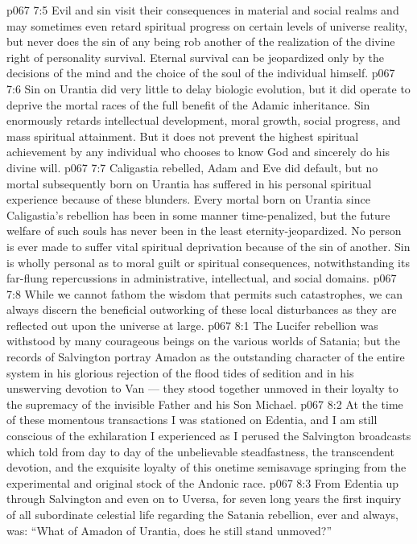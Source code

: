 \vs p067 7:5 Evil and sin visit their consequences in material and social realms and may sometimes even retard spiritual progress on certain levels of universe reality, but never does the sin of any being rob another of the realization of the divine right of personality survival. Eternal survival can be jeopardized only by the decisions of the mind and the choice of the soul of the individual himself.
\vs p067 7:6 Sin on Urantia did very little to delay biologic evolution, but it did operate to deprive the mortal races of the full benefit of the Adamic inheritance. Sin enormously retards intellectual development, moral growth, social progress, and mass spiritual attainment. But it does not prevent the highest spiritual achievement by any individual who chooses to know God and sincerely do his divine will.
\vs p067 7:7 Caligastia rebelled, Adam and Eve did default, but no mortal subsequently born on Urantia has suffered in his personal spiritual experience because of these blunders. Every mortal born on Urantia since Caligastia’s rebellion has been in some manner time\hyp{}penalized, but the future welfare of such souls has never been in the least eternity\hyp{}jeopardized. No person is ever made to suffer vital spiritual deprivation because of the sin of another. Sin is wholly personal as to moral guilt or spiritual consequences, notwithstanding its far\hyp{}flung repercussions in administrative, intellectual, and social domains.
\vs p067 7:8 \pc While we cannot fathom the wisdom that permits such catastrophes, we can always discern the beneficial outworking of these local disturbances as they are reflected out upon the universe at large.
\vs p067 8:1 The Lucifer rebellion was withstood by many courageous beings on the various worlds of Satania; but the records of Salvington portray Amadon as the outstanding character of the entire system in his glorious rejection of the flood tides of sedition and in his unswerving devotion to Van --- they stood together unmoved in their loyalty to the supremacy of the invisible Father and his Son Michael.
\vs p067 8:2 At the time of these momentous transactions I was stationed on Edentia, and I am still conscious of the exhilaration I experienced as I perused the Salvington broadcasts which told from day to day of the unbelievable steadfastness, the transcendent devotion, and the exquisite loyalty of this onetime semisavage springing from the experimental and original stock of the Andonic race.
\vs p067 8:3 From Edentia up through Salvington and even on to Uversa, for seven long years the first inquiry of all subordinate celestial life regarding the Satania rebellion, ever and always, was: “What of Amadon of Urantia, does he still stand unmoved?”
